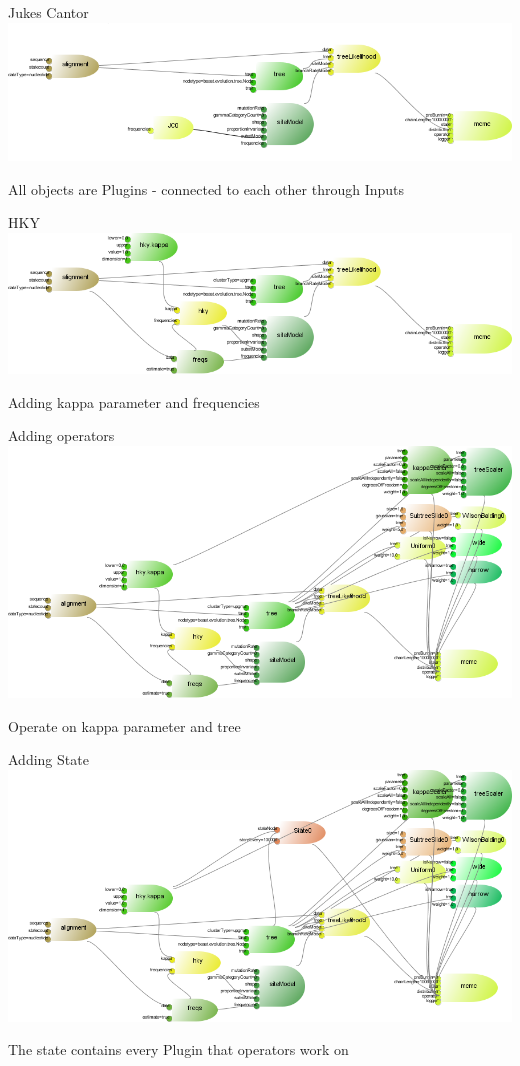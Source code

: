 \documentclass{beamer}
\theoremstyle{definition}
\begin{document}
\begin{frame}{Jukes Cantor}
\includegraphics[width=\textwidth]{example1.png}

All objects are Plugins - connected to each other through Inputs
\end{frame}
\begin{frame}{HKY}
\includegraphics[width=\textwidth]{example2.png}

Adding kappa parameter and frequencies
\end{frame}
\begin{frame}{Adding operators}
\includegraphics[width=\textwidth]{example3.png}

Operate on kappa parameter and tree
\end{frame}
\begin{frame}{Adding State}
\includegraphics[width=\textwidth]{example4.png}

The state contains every Plugin that operators work on
\end{frame}
\end{document}
